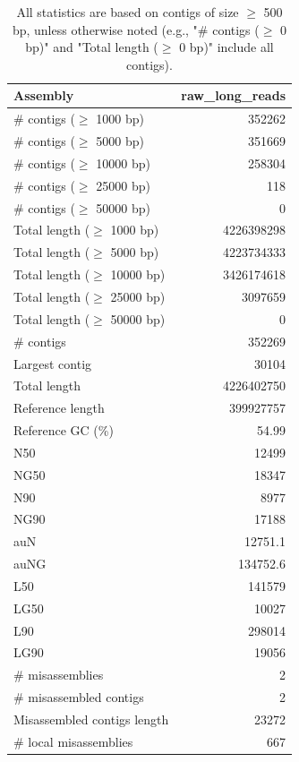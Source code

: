 \documentclass[12pt,a4paper]{article}
\begin{document}
\begin{table}[ht]
\begin{center}
\caption{All statistics are based on contigs of size $\geq$ 500 bp, unless otherwise noted (e.g., "\# contigs ($\geq$ 0 bp)" and "Total length ($\geq$ 0 bp)" include all contigs).}
\begin{tabular}{|l*{1}{|r}|}
\hline
Assembly & raw\_long\_reads \\ \hline
\# contigs ($\geq$ 1000 bp) & 352262 \\ \hline
\# contigs ($\geq$ 5000 bp) & 351669 \\ \hline
\# contigs ($\geq$ 10000 bp) & 258304 \\ \hline
\# contigs ($\geq$ 25000 bp) & 118 \\ \hline
\# contigs ($\geq$ 50000 bp) & 0 \\ \hline
Total length ($\geq$ 1000 bp) & 4226398298 \\ \hline
Total length ($\geq$ 5000 bp) & 4223734333 \\ \hline
Total length ($\geq$ 10000 bp) & 3426174618 \\ \hline
Total length ($\geq$ 25000 bp) & 3097659 \\ \hline
Total length ($\geq$ 50000 bp) & 0 \\ \hline
\# contigs & 352269 \\ \hline
Largest contig & 30104 \\ \hline
Total length & 4226402750 \\ \hline
Reference length & 399927757 \\ \hline
Reference GC (\%) & 54.99 \\ \hline
N50 & 12499 \\ \hline
NG50 & 18347 \\ \hline
N90 & 8977 \\ \hline
NG90 & 17188 \\ \hline
auN & 12751.1 \\ \hline
auNG & 134752.6 \\ \hline
L50 & 141579 \\ \hline
LG50 & 10027 \\ \hline
L90 & 298014 \\ \hline
LG90 & 19056 \\ \hline
\# misassemblies & 2 \\ \hline
\# misassembled contigs & 2 \\ \hline
Misassembled contigs length & 23272 \\ \hline
\# local misassemblies & 667 \\ \hline

\end{tabular}
\end{center}
\end{table}
\end{document}
